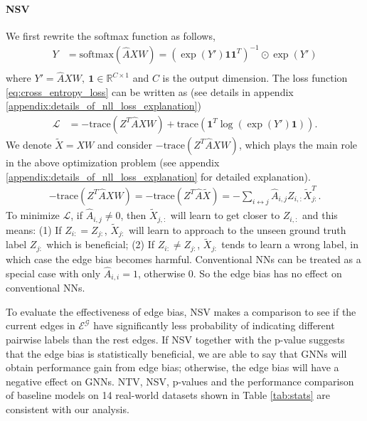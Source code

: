 \documentclass{article}
\newcommand{\trace}{\mathrm{trace}}
\newcommand{\0}{{\boldsymbol{0}}}
\newcommand{\6}{{\partial}}
\newcommand{\8}{{\infty}}
\newcommand{\4}{{\nabla}}
\begin{document}
\paragraph{NSV} We first rewrite the softmax function as follows,
\begin{equation}
    \begin{aligned}
    Y & = \text{softmax} (\hat{A}  X W ) =\left(\exp({Y'}) \bm{1} \bm{1}^T \right)^{-1}  \odot \exp({Y'}) \\
    \end{aligned}
\end{equation}
where $Y' = \hat{A}  X W,\ \bm{1} \in \mathbb{R}^{C\times 1}$ and $C$ is the output dimension. The loss function \eqref{eq:cross_entropy_loss} can be written as (see details in appendix \ref{appendix:details_of_nll_loss_explanation})
\begin{equation}
    \begin{aligned}
    \label{eq:nll_loss_explanation}
    \mathcal{L} & = -\trace\left(Z^T \hat{A} X W  \right) + \trace\left(\bm{1}^T  \log\left(\exp({Y'}) \bm{1} \right)  \right).
    \end{aligned}
\end{equation}
We denote $\tilde{X}=XW$ and consider $-\trace\left(Z^T \hat{A} X W  \right)$, which plays the main role in the above optimization problem (see appendix \ref{appendix:details_of_nll_loss_explanation} for detailed explanation). 
\begin{equation}
    \begin{aligned}
    \label{eq:adjacency_and_labels_relation}
    -\trace\left(Z^T \hat{A} X W  \right) = -\trace\left(Z^T \hat{A} \tilde{X} \right) = - \sum\limits_{i\leftrightarrow j}  \hat{A}_{i,j} Z_{i,:}\tilde{X}_{j:}^T.
    \end{aligned}
\end{equation}
To minimize $\mathcal{L}$, if $\hat{A}_{i,j}\neq 0$, then $\tilde{X}_{j,:}$ will learn to get closer to $Z_{i,:}$ and this means: (1) If $Z_{i:}=Z_{j:}$, $\tilde{X}_{j:}$ will learn to approach to the unseen ground truth label $Z_{j:}$ which is beneficial; (2) If $Z_{i:}\neq Z_{j:}$, $\tilde{X}_{j:}$ tends to learn a wrong label, in which case the edge bias becomes harmful. Conventional NNs can be treated as a special case with only $\hat{A}_{i,i} =1$, otherwise 0. So the edge bias has no effect on conventional NNs.

To evaluate the effectiveness of edge bias, NSV makes a comparison to see if the current edges in $\mathcal{E^G}$ have significantly less probability of indicating different pairwise labels than the rest edges. If NSV together with the p-value suggests that the edge bias is statistically beneficial, we are able to say that GNNs will obtain performance gain from edge bias; otherwise, the edge bias will have a negative effect on GNNs. NTV, NSV, p-values and the performance comparison of baseline models on 14 real-world datasets shown in Table \ref{tab:stats} are consistent with our analysis.
\end{document}
